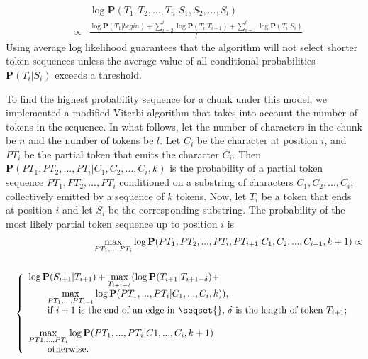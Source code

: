 \begin{eqnarray}
&& \log \mathbf{P}(T_1, T_2, ..., T_n|S_1, S_2, ..., S_l) \nonumber \\ 
& \propto & \frac{\log \mathbf{P}(T_1|begin) +
\sum_{i=2}^{l}\log \mathbf{P}(T_i|T_{i-1}) + 
\sum_{i=1}^{l}\log \mathbf{P}(T_i|S_i)}{l}\label{eqn:mod-viterbi}
\end{eqnarray}
\noindent
Using average log likelihood 
guarantees that the algorithm will not select shorter token sequences
unless the average value of all conditional
probabilities $\mathbf{P}(T_i|S_i)$ exceeds a threshold.

To find the highest probability sequence for a chunk under this model,
we implemented a modified Viterbi algorithm
that takes into account the number of tokens in the sequence.
In what follows,
let the number of characters in the chunk be $n$ and the number 
of tokens be $l$.  Let $C_i$ be the character at position $i$, and 
$PT_i$ be the partial token that emits the character $C_i$. 
Then
$\mathbf{P}(PT_1, PT_2, ..., PT_i|C_1, C_2, ..., C_i, k)$ is the
probability of a partial token sequence $PT_1, PT_2, ..., PT_i$
conditioned on a substring of characters $C_1, C_2, ..., C_i$,
collectively emitted by a sequence of $k$ tokens.
Now, let $T_i$ be a token
that ends at position $i$ and let $S_i$ be the corresponding substring. 
The probability of the most likely partial token sequence up to position 
$i$ is
\begin{eqnarray} 
&&\displaystyle{\max_{PT_1, ..., PT_i}}\log\mathbf{P}(PT_1, PT_2, ..., PT_i,
PT_{i+1}|C_1, C_2, ..., C_{i+1}, k+1) \propto \nonumber \\
&& \nonumber \\
&&\left\{
  \begin{array}{ll}
    \log \mathbf{P}(S_{i+1}|T_{i+1}) + 
    \displaystyle{\max_{T_{i+1-\delta}}}(\log\mathbf{P}(T_{i+1}|T_{i+1-\delta}) + \\
    \qquad \displaystyle{\max_{PT_1, ..., PT_{i-1}}}\log\mathbf{P}(PT_1, ..., PT_i|C_1, ..., C_i, k)), 
& \\ 
  \qquad \hbox{if $i+1$ is the end of an edge in \seqset{},
  $\delta$ is the length of token $T_{i+1}$;} \\\\
    \displaystyle{\max_{PT1, ..., PT_i}}\log\mathbf{P}(PT_1, ..., PT_i|C1, ...,
  C_i, k+1) \\
\qquad \hbox{otherwise.}
  \end{array}
\right. \label{eqn-forward}
\end{eqnarray}

